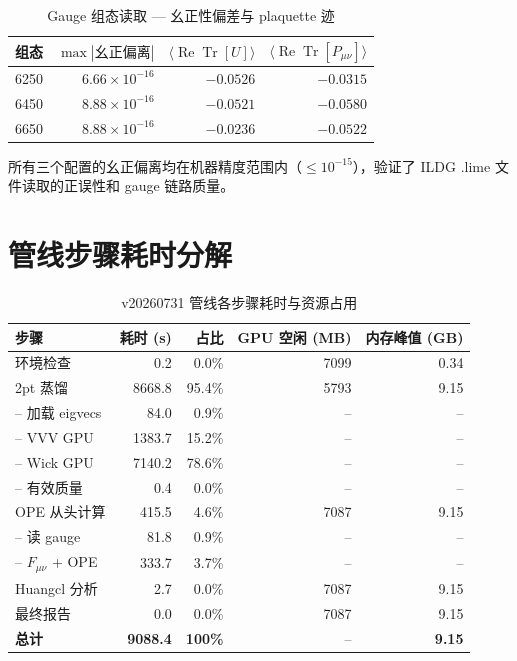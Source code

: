 \documentclass[12pt,a4paper]{ctexart}
\begin{document}
\begin{table}[H]
\centering
\caption{Gauge 组态读取 — 幺正性偏差与 plaquette 迹}
\begin{tabular}{lrrr}
\toprule
组态 & $\max|\text{幺正偏离}|$ & $\langle \operatorname{Re}\operatorname{Tr}[U]\rangle$ & $\langle \operatorname{Re}\operatorname{Tr}[P_{\mu\nu}]\rangle$ \\
\midrule
6250 & $6.66\times 10^{-16}$ & $-0.0526$ & $-0.0315$ \\
6450 & $8.88\times 10^{-16}$ & $-0.0521$ & $-0.0580$ \\
6650 & $8.88\times 10^{-16}$ & $-0.0236$ & $-0.0522$ \\
\bottomrule
\end{tabular}
\end{table}

所有三个配置的幺正偏离均在机器精度范围内（$ \le 10^{-15}$），验证了 ILDG .lime 文件读取的正误性和 gauge 链路质量。

\section{管线步骤耗时分解}

\begin{table}[H]
\centering
\caption{v20260731 管线各步骤耗时与资源占用}
\begin{tabular}{lrrrr}
\toprule
步骤 & 耗时 (s) & 占比 & GPU 空闲 (MB) & 内存峰值 (GB) \\
\midrule
环境检查 & 0.2 & 0.0\% & 7099 & 0.34 \\
2pt 蒸馏 & 8668.8 & 95.4\% & 5793 & 9.15 \\
\quad -- 加载 eigvecs & 84.0 & 0.9\% & -- & -- \\
\quad -- VVV GPU & 1383.7 & 15.2\% & -- & -- \\
\quad -- Wick GPU & 7140.2 & 78.6\% & -- & -- \\
\quad -- 有效质量 & 0.4 & 0.0\% & -- & -- \\
OPE 从头计算 & 415.5 & 4.6\% & 7087 & 9.15 \\
\quad -- 读 gauge & 81.8 & 0.9\% & -- & -- \\
\quad -- $F_{\mu\nu}$ + OPE & 333.7 & 3.7\% & -- & -- \\
Huangcl 分析 & 2.7 & 0.0\% & 7087 & 9.15 \\
最终报告 & 0.0 & 0.0\% & 7087 & 9.15 \\
\midrule
\textbf{总计} & \textbf{9088.4} & \textbf{100\%} & -- & \textbf{9.15} \\
\bottomrule
\end{tabular}
\end{table}
\end{document}
